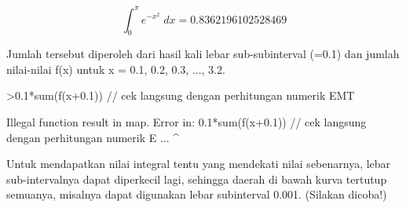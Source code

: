 \documentclass[a4paper,10pt]{article}
\begin{document}
\begin{eulernotebook}
\begin{eulercomment}
\begin{eulercomment}
\begin{eulercomment}
\begin{eulercomment}
\begin{eulercomment}
\begin{eulercomment}
\begin{eulercomment}
\begin{eulercomment}
\begin{eulercomment}
\begin{eulercomment}
\begin{eulercomment}
\begin{eulercomment}
\begin{eulercomment}
\begin{eulercomment}
\begin{eulercomment}
\begin{eulercomment}
\begin{eulercomment}
\begin{eulercomment}
\begin{eulercomment}
\begin{eulercomment}
\begin{eulercomment}
\begin{eulercomment}
\begin{eulercomment}
\begin{eulercomment}
\begin{eulercomment}
\begin{eulercomment}
\begin{eulercomment}
\begin{eulercomment}
\begin{eulercomment}
\end{eulercomment}
\begin{eulerformula}
\[
\int_{0}^{\pi}{e^ {- x^2 }\;dx}=0.8362196102528469
\]
\end{eulerformula}
\begin{eulercomment}
Jumlah tersebut diperoleh dari hasil kali lebar sub-subinterval (=0.1)
dan jumlah nilai-nilai f(x) untuk x = 0.1, 0.2, 0.3, ..., 3.2.
\end{eulercomment}
\begin{eulerprompt}
>0.1*sum(f(x+0.1)) // cek langsung dengan perhitungan numerik EMT
\end{eulerprompt}
\begin{euleroutput}
  Illegal function result in map.
  Error in:
  0.1*sum(f(x+0.1)) // cek langsung dengan perhitungan numerik E ...
                  ^
\end{euleroutput}
\begin{eulercomment}
Untuk mendapatkan nilai integral tentu yang mendekati nilai
sebenarnya, lebar sub-intervalnya dapat diperkecil lagi, sehingga
daerah di bawah kurva tertutup semuanya, misalnya dapat digunakan
lebar subinterval 0.001. (Silakan dicoba!)


\end{eulercomment}
\end{eulercomment}
\end{eulercomment}
\end{eulercomment}
\end{eulercomment}
\end{eulercomment}
\end{eulercomment}
\end{eulercomment}
\end{eulercomment}
\end{eulercomment}
\end{eulercomment}
\end{eulercomment}
\end{eulercomment}
\end{eulercomment}
\end{eulercomment}
\end{eulercomment}
\end{eulercomment}
\end{eulercomment}
\end{eulercomment}
\end{eulercomment}
\end{eulercomment}
\end{eulercomment}
\end{eulercomment}
\end{eulercomment}
\end{eulercomment}
\end{eulercomment}
\end{eulercomment}
\end{eulercomment}
\end{eulercomment}
\end{eulernotebook}
\end{document}
